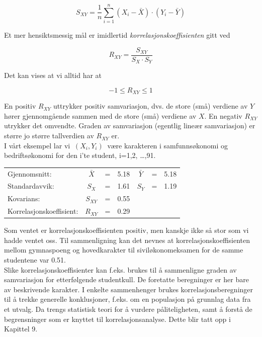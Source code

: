 \[S_{XY} =\frac{1}{n} \sum_{i=1}^{n}(X_{i}-\bar{X})\cdot(Y_{i}-\bar{Y}) \]

\noindent 
Et mer hensiktsmessig mål er imidlertid {\em korrelasjonskoeffisienten}
gitt ved

\[R_{XY} = \frac{S_{XY}}{S_{X} \cdot S_{Y}} \]

\noindent Det kan vises at vi alltid har at


\[-1\leq R_{XY} \leq 1 \]         

\noindent En positiv $R_{XY}$ uttrykker positiv samvariasjon, dvs. de store (små)
verdiene av $Y$ hører gjennomgående sammen med de store (små)
verdiene av $X$. En negativ $R_{XY}$ utrykker det omvendte. Graden av
samvariasjon (egentlig lineær samvariasjon) er større jo større 
tallverdien av $R_{XY}$ er. \\                                   
                   
I vårt eksempel lar vi $\ (X_{i}, Y_{i})\ $ være karakteren i
samfunnsøkonomi og bedriftsøkonomi for den i'te student, i=1,2, \ldots ,91.\\
 \begin{center}
  \begin{tabular}{lcccccc}
 Gjennomsnitt:         & $\bar{X}$ & = & 5.18 & $\bar{Y}$ & = & 5.18  \\
 Standardavvik:        & $S_{X}$  & = & 1.61 & $S_{Y}$ & = & 1.19  \\
 Kovarians:            & $S_{XY}$ & = & 0.55 & &  &  \\
 Korrelasjonskoeffisient: & $R_{XY}$ & = & 0.29 & & & \\
  \end{tabular}
 \end{center}         

 \noindent Som ventet er korrelasjonskoeffisienten positiv, men kanskje ikke
 så stor som vi hadde ventet oss. Til sammenligning kan det nevnes at
 korrelasjons\-koef\-fisienten mellom gymnaspoeng og hovedkarakter til 
 siviløkonomeksamen for de samme studentene var 0.51.\\

 Slike korrelasjonskoeffisienter kan f.eks. brukes til å sammenligne
 graden av samvariasjon for etterfølgende studentkull. De foretatte
 beregninger er her bare av beskrivende karakter. I enkelte sammenhenger
 brukes korrelasjonsberegninger til å trekke generelle konklusjoner,
 f.eks. om en populasjon på grunnlag data fra et utvalg. 
 Da trengs statistisk teori for å vurdere påliteligheten, samt å
 forstå de begrensninger som er knyttet til korrela\-sjons\-analyse.
 Dette blir tatt opp i Kapittel 9.\\

